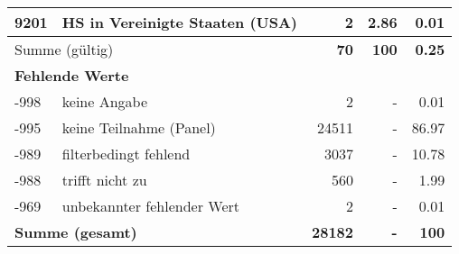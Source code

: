 \begin{longtable}{lXrrr}
     9201 &
     \multicolumn{1}{X}{ HS in Vereinigte Staaten (USA)   } &


       \num{2} &
       \num[round-mode=places,round-precision=2]{2.86} &
         \num[round-mode=places,round-precision=2]{0.01} \\
     \midrule
     \multicolumn{2}{l}{Summe (gültig)} &
       \textbf{\num{70}} &
     \textbf{\num{100}} &
       \textbf{\num[round-mode=places,round-precision=2]{0.25}} \\
     \multicolumn{5}{l}{\textbf{Fehlende Werte}}\\
       -998 &
       keine Angabe &
         \num{2} &
        - &
         \num[round-mode=places,round-precision=2]{0.01} \\
       -995 &
       keine Teilnahme (Panel) &
         \num{24511} &
        - &
         \num[round-mode=places,round-precision=2]{86.97} \\
       -989 &
       filterbedingt fehlend &
         \num{3037} &
        - &
         \num[round-mode=places,round-precision=2]{10.78} \\
       -988 &
       trifft nicht zu &
         \num{560} &
        - &
         \num[round-mode=places,round-precision=2]{1.99} \\
       -969 &
       unbekannter fehlender Wert &
         \num{2} &
        - &
         \num[round-mode=places,round-precision=2]{0.01} \\
     \midrule
     \multicolumn{2}{l}{\textbf{Summe (gesamt)}} &
          \textbf{\num{28182}} &
        \textbf{-} &
        \textbf{\num{100}} \\
     \bottomrule
     \end{longtable}
     
